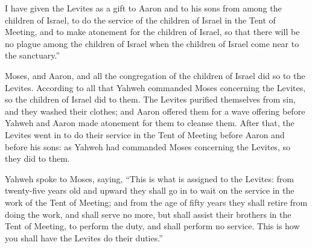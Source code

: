 {I have given the Levites as a gift to Aaron and to his sons from among the children of Israel, to do the service of the children of Israel in the Tent of Meeting, and to make atonement for the children of Israel, so that there will be no plague among the children of Israel when the children of Israel come near to the sanctuary.”
\par }{\PP {}Moses, and Aaron, and all the congregation of the children of Israel did so to the Levites. According to all that Yahweh commanded Moses concerning the Levites, so the children of Israel did to them.
The Levites purified themselves from sin, and they washed their clothes; and Aaron offered them for a wave offering before Yahweh and Aaron made atonement for them to cleanse them.
After that, the Levites went in to do their service in the Tent of Meeting before Aaron and before his sons: as Yahweh had commanded Moses concerning the Levites, so they did to them.
\par }{\PP {}Yahweh spoke to Moses, saying,
“This is what is assigned to the Levites: from twenty-five years old and upward they shall go in to wait on the service in the work of the Tent of Meeting;
and from the age of fifty years they shall retire from doing the work, and shall serve no more,
but shall assist their brothers in the Tent of Meeting, to perform the duty, and shall perform no service. This is how you shall have the Levites do their duties.”

}

